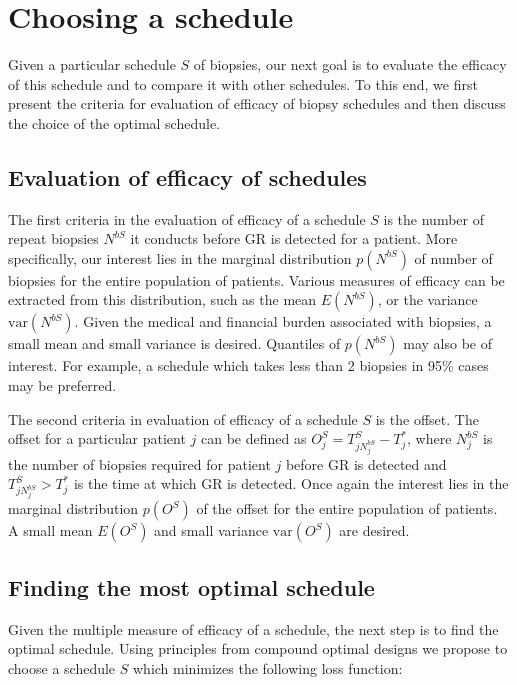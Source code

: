 
\section{Choosing a schedule}
\label{sec : choosing_schedule}
Given a particular schedule $S$ of biopsies, our next goal is to evaluate the efficacy of this schedule and to compare it with other schedules. To this end, we first present the criteria for evaluation of efficacy of biopsy schedules and then discuss the choice of the optimal schedule.

\subsection{Evaluation of efficacy of schedules}
The first criteria in the evaluation of efficacy of a schedule $S$ is the number of repeat biopsies $N^{bS}$ it conducts before GR is detected for a patient. More specifically, our interest lies in the marginal distribution $p(N^{bS})$ of number of biopsies for the entire population of patients. Various measures of efficacy can be extracted from this distribution, such as the mean $E(N^{bS})$, or the variance $\mbox{var}(N^{bS})$. Given the medical and financial burden associated with biopsies, a small mean and small variance is desired. Quantiles of $p(N^{bS})$ may also be of interest. For example, a schedule which takes less than 2 biopsies in 95\% cases may be preferred.

The second criteria in evaluation of efficacy of a schedule $S$ is the offset. The offset for a particular patient $j$ can be defined as $O^S_j = T^S_{j{N^{bS}_j}} - T^*_j$, where $N^{bS}_j$ is the number of biopsies required for patient $j$ before GR is detected and $T^S_{j{N^{bS}_j}} > T^*_j$ is the time at which GR is detected. Once again the interest lies in the marginal distribution $p(O^S)$ of the offset for the entire population of patients. A small mean $E(O^S)$ and small variance $\mbox{var}(O^S)$ are desired.

\subsection{Finding the most optimal schedule}
Given the multiple measure of efficacy of a schedule, the next step is to find the optimal schedule. Using principles from compound optimal designs \citep{lauter1976optimal} we propose to choose a schedule $S$ which minimizes the following loss function:

